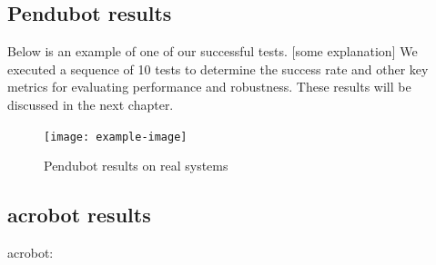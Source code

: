 \subsection{Pendubot results}
Below is an example of one of our successful tests. [some explanation] We executed a sequence of 10 tests to determine the success rate and other key metrics for evaluating performance and robustness. These results will be discussed in the next chapter. 

\begin{figure}[H]
    \centering
    \texttt{[image: example-image]}
    \caption{Pendubot results on real systems}
    \label{fig:my_label}
\end{figure}

\subsection{acrobot results}
acrobot:

\cleardoublepage
